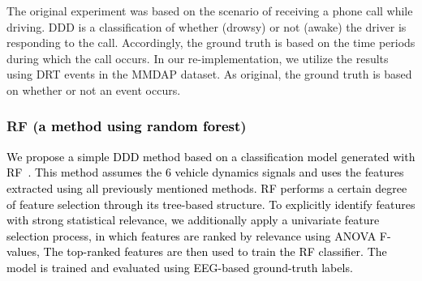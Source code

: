 \documentclass[letterpaper, 10 pt, conference]{ieeeconf}  %
\newcommand{\Review}[1]{\textcolor{black}{#1}}
\newcommand{\Ishii}[1]{\textcolor{black}{#1}}
\newcommand{\Impl}[1]{\textsc{#1}}
\begin{document}
The original experiment was based on the scenario of receiving a phone call while driving.
DDD is a classification of whether (drowsy) or not (awake) the driver is responding to the call.
Accordingly, the ground truth is based on the time periods during which the call occurs.
%
In our re-implementation, we utilize the results using DRT events in the MMDAP dataset.
As original, the ground truth is based on whether or not an event occurs.

\vspace{.5em}

\subsubsection{\Impl{RF} (\Ishii{a method using random forest})}

\Review{We propose a simple 
DDD method based on a classification model generated with RF~\cite{Breiman2001}.
%
This method assumes the 6 vehicle dynamics signals and uses the features extracted using all previously mentioned methods. 
%
RF performs a certain degree of feature selection through its tree-based structure. 
To explicitly identify features with strong statistical relevance,
we additionally apply a univariate feature selection process, in which features are ranked by relevance using ANOVA F-values, 
The top-ranked features are then used to train the RF classifier. 
%
The model is trained and evaluated using EEG-based ground-truth labels. 
%
}

\end{document}
